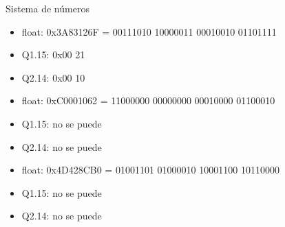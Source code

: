 \begin{frame}{Sistema de números}
{\begin{itemize}
      \end{itemize}
      \begin{itemize}
           0.001
        \item{float: 0x3A83126F = 00111010 10000011 00010010 01101111}
        \item{Q1.15: 0x00 21}
        \item{Q2.14: 0x00 10}
      \end{itemize}
      \begin{itemize}
           -2.001
        \item{float: 0xC0001062 = 11000000 00000000 00010000 01100010}
        \item{Q1.15: no se puede}
        \item{Q2.14: no se puede}
      \end{itemize}
      \begin{itemize}
             204000000
        \item{float: 0x4D428CB0 = 01001101 01000010 10001100 10110000}
        \item{Q1.15: no se puede}
        \item{Q2.14: no se puede}
      \end{itemize}

   }
 \end{frame}
